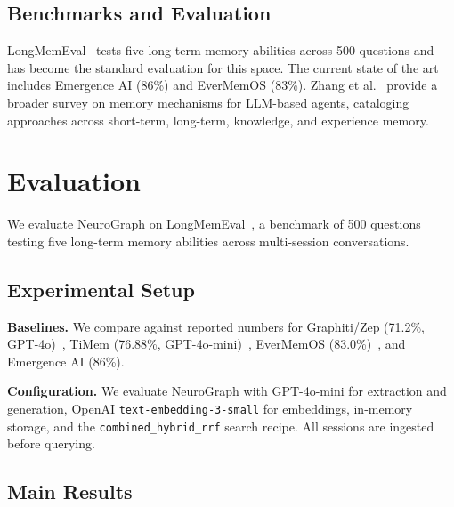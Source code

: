 \documentclass[11pt,a4paper,twocolumn]{article}
\begin{document}
\subsection{Benchmarks and Evaluation}

LongMemEval~\cite{longmemeval2025} tests five long-term memory
abilities across 500 questions and has become the standard
evaluation for this space. The current state of the art includes
Emergence AI (86\%) and EverMemOS (83\%).
Zhang et al.~\cite{memsurvey2024} provide a broader survey on
memory mechanisms for LLM-based agents, cataloging approaches
across short-term, long-term, knowledge, and experience memory.

\section{Evaluation}
\label{sec:evaluation}

We evaluate NeuroGraph on LongMemEval~\cite{longmemeval2025},
a benchmark of 500 questions testing five long-term memory
abilities across multi-session conversations.

\subsection{Experimental Setup}

\textbf{Baselines.} We compare against reported numbers for
Graphiti/Zep (71.2\%, GPT-4o)~\cite{graphiti2025},
TiMem (76.88\%, GPT-4o-mini)~\cite{timem2026},
EverMemOS (83.0\%)~\cite{evermemos2026b}, and
Emergence AI (86\%).

\textbf{Configuration.} We evaluate NeuroGraph with GPT-4o-mini
for extraction and generation, OpenAI
\texttt{text-embedding-3-small} for embeddings, in-memory storage,
and the \texttt{combined\_hybrid\_rrf} search recipe. All sessions
are ingested before querying.

\subsection{Main Results}
\end{document}
